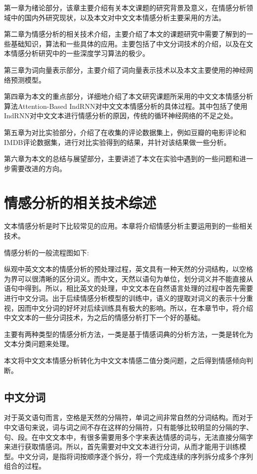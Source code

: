 \documentclass[a4paper,AutoFakeBold,oneside,12pt]{book}
\begin{document}
第一章为绪论部分，该章主要介绍有关本文课题的研究背景及意义，在情感分析领域中的国内外研究现状，以及本文对中文文本情感分析主要采用的方法。

第二章为情感分析的相关技术介绍，主要介绍了本文的课题研究中需要了解到的一些基础知识，算法和一些具体的应用。主要包括了中文分词技术的介绍，以及在文本情感分析研究中的一些深度学习算法的极少。

第三章为词向量表示部分，主要介绍了词向量表示技术以及本文主要使用的神经网络预测模型。

第四章为本文的重点部分，详细地介绍了本文研究课题所采用的中文文本情感分析算法Attention-Based IndRNN对中文文本情感分析的具体过程。其中包括了使用IndRNN对中文文本进行情感分析的原因，传统的循环神经网络的不足之处。

第五章为对比实验部分，介绍了在收集的评论数据集上，例如豆瓣的电影评论和IMDB评论数据集，进行对比实验得到的结果，并针对该结果做一些分析。

第六章为本文的总结与展望部分，主要讲述了本文在实验中遇到的一些问题和进一步需要改进的方向。


\chapter{情感分析的相关技术综述}
文本情感分析是时下比较常见的应用。本章将介绍情感分析主要运用到的一些相关技术。

情感分析的一般流程图如下:


纵观中英文文本的情感分析的预处理过程，英文具有一种天然的分词结构，以空格为界可以很清晰的区分词义。而中文，天然以语句为单位，划分词义并不能直接从语句中得到。所以，相比英文的处理，中文文本在自然语言处理的过程中首先需要进行中文分词。出于后续情感分析模型的训练中，语义的提取对词义的表示十分重视，因而中文分词的好坏对后续训练具有极大的影响。所以，在本章节中，将介绍中文文本的一些分词技术，为之后的情感分析打下一个好的基础。

主要有两种类型的情感分析方法，一类是基于情感词典的分析方法，一类是转化为文本分类问题来处理。

本文将中文文本情感分析转化为中文文本情感二值分类问题，之后得到情感倾向判断。


\section{中文分词}
对于英文语句而言，空格是天然的分隔符，单词之间非常自然的分词结构。而对于中文语句来说，词与词之间不存在这样的分隔符，只有能够比较明显的分隔的字、句、段。在中文文本中，有很多需要用多个字来表达情感的词与，无法直接分隔字来进行获取情感词。所以，首先需要对中文文本进行分词，从而才能用于训练模型。中文分词，是指将词按顺序逐个拆分，将一个完成连续的序列拆分成多个序列组合的过程。
\end{document}

